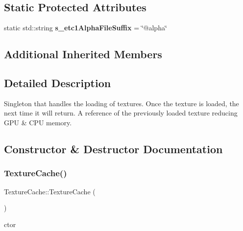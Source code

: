 \subsection*{Static Protected Attributes}
\begin{DoxyCompactItemize}
\item 
\mbox{\label{classTextureCache_a4918a56d5253decf8f5f91491235b7b2}} 
static std\+::string {\bfseries s\+\_\+etc1\+Alpha\+File\+Suffix} = \char`\"{}@alpha\char`\"{}
\end{DoxyCompactItemize}
\subsection*{Additional Inherited Members}


\subsection{Detailed Description}
Singleton that handles the loading of textures. Once the texture is loaded, the next time it will return. A reference of the previously loaded texture reducing G\+PU \& C\+PU memory. 

\subsection{Constructor \& Destructor Documentation}
\mbox{\label{classTextureCache_aaec6e0e3c0b4c5bfed1c31187cea44c4}} 
\subsubsection{\texorpdfstring{Texture\+Cache()}{TextureCache()}\hspace{0.1cm}{\footnotesize\ttfamily [1/2]}}
{\footnotesize\ttfamily Texture\+Cache\+::\+Texture\+Cache (\begin{DoxyParamCaption}{ }\end{DoxyParamCaption})}

ctor \mbox{\label{classTextureCache_aacfd218a0a417210f696f6da7c351643}} 
